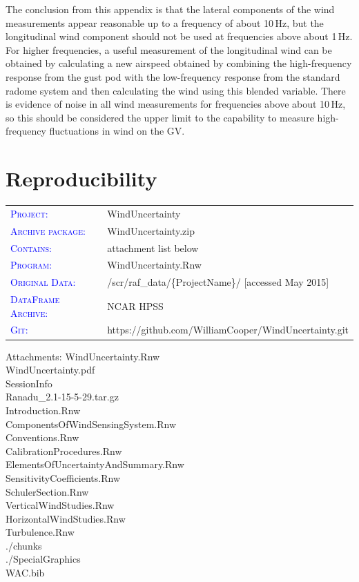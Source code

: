 \documentclass[12pt,twoside,english]{article}\usepackage[]{graphicx}\usepackage[]{color}
\providecommand{\tabularnewline}{\\}
\let\stdsection\section
\renewcommand{\section}{\newpage\stdsection}
\newenvironment{lyxlist}[1]
{\begin{list}{}
{\settowidth{\labelwidth}{#1}
\setlength{\leftmargin}{\labelwidth}
\addtolength{\leftmargin}{\labelsep}
\renewcommand{\makelabel}[1]{##1\hfil}}}
{\end{list}}
\newcommand{\attachm}[1]{\begin{lyxlist}{Attachments:00}
\item [Attachments:] {#1}
\end{lyxlist}}
\begin{document}
The conclusion from this appendix is that the lateral components of the wind measurements appear reasonable up to a frequency of about 10\,Hz, but the longitudinal wind component should not be used at frequencies above about 1\,Hz. For higher frequencies, a useful measurement of the longitudinal wind can be obtained by calculating a new airspeed obtained by combining the high-frequency response from the gust pod with the low-frequency response from the standard radome system and then calculating the wind using this blended variable. There is evidence of noise in all wind measurements for frequencies above about 10\,Hz, so this should be considered the upper limit to the capability to measure high-frequency fluctuations in wind on the GV. 

\section{Reproducibility}


\begin{tabular}{ll}
\textsf{\textsc{\textcolor{blue}{Project:}}} & WindUncertainty\tabularnewline
\textsf{\textsc{\textcolor{blue}{Archive package:}}} & WindUncertainty.zip\tabularnewline
\textsf{\textsc{\textcolor{blue}{Contains:}}} & attachment list below\tabularnewline
\textsf{\textsc{\textcolor{blue}{Program:}}} & WindUncertainty.Rnw\tabularnewline
\textsf{\textsc{\textcolor{blue}{Original Data:}}} & /scr/raf\_data/\{ProjectName\}/ [accessed May 2015] \tabularnewline
\textsf{\textsc{\textcolor{blue}{DataFrame Archive:}}} & NCAR HPSS\tabularnewline
\textsf{\textsc{\textcolor{blue}{Git:}}} & https://github.com/WilliamCooper/WindUncertainty.git\tabularnewline
\end{tabular}

\attachm{WindUncertainty.Rnw\\WindUncertainty.pdf\\SessionInfo\\Ranadu\_2.1-15-5-29.tar.gz\\Introduction.Rnw\\ComponentsOfWindSensingSystem.Rnw\\Conventions.Rnw\\CalibrationProcedures.Rnw\\ElementsOfUncertaintyAndSummary.Rnw\\SensitivityCoefficients.Rnw\\SchulerSection.Rnw\\VerticalWindStudies.Rnw\\HorizontalWindStudies.Rnw\\Turbulence.Rnw\\./chunks\\./SpecialGraphics\\WAC.bib}
\end{document}

